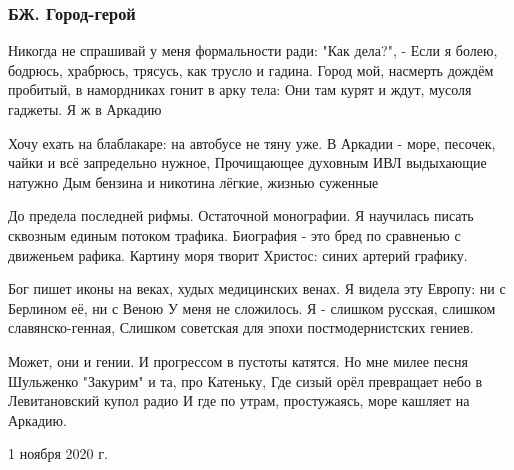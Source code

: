  
 
 

\subsubsection{БЖ. Город-герой}

Никогда не спрашивай у меня формальности ради: "Как дела?", -
Если я болею, бодрюсь, храбрюсь, трясусь, как трусло и гадина.
Город мой, насмерть дождём пробитый, в намордниках гонит в арку тела:
Они там курят и ждут, мусоля гаджеты. Я ж в Аркадию

Хочу ехать на блаблакаре: на автобусе не тяну уже.
В Аркадии - море, песочек, чайки и всё запредельно нужное,
Прочищающее духовным ИВЛ выдыхающие натужно
Дым бензина и никотина лёгкие, жизнью суженные

До предела последней рифмы. Остаточной монографии.
Я научилась писать сквозным единым потоком трафика.
Биография - это бред по сравненью с движеньем рафика.
Картину моря творит Христос: синих артерий графику.

Бог пишет иконы на веках, худых медицинских венах.
Я видела эту Европу: ни с Берлином её, ни с Веною
У меня не сложилось. Я - слишком русская, слишком славянско-генная,
Слишком советская для эпохи постмодернистских гениев.

Может, они и гении. И прогрессом в пустоты катятся.
Но мне милее песня Шульженко "Закурим" и та, про Катеньку,
Где сизый орёл превращает небо в Левитановский купол радио
И где по утрам, простужаясь, море кашляет на Аркадию.

1 ноября 2020 г.
